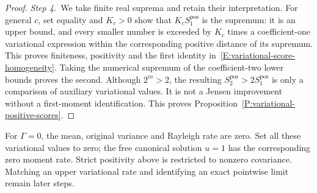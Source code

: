\begin{proof}
  \medskip
  \noindent\textit{Step 4.~}We take finite real suprema and retain their
  interpretation.
  For general $c$, set equality and $K_c > 0$ show that $K_cS_1^{\mathrm{pos}}$
  is the supremum: it is an upper bound, and every smaller number is exceeded by
  $K_c$ times a coefficient-one variational expression within the corresponding
  positive distance of its supremum. This proves finiteness, positivity and the
  first identity in~\eqref{E:variational-score-homogeneity}. Taking the
  numerical supremum of the coefficient-two lower bounds proves the second.
  Although $2^m > 2$, the resulting $S_2^{\mathrm{pos}} > 2S_1^{\mathrm{pos}}$
  is only a comparison of auxiliary variational values. It is not a Jensen
  improvement without a first-moment identification. This proves
  Proposition~\ref{P:variational-positive-scores}.
\end{proof}

For $\Gamma = 0$, the mean, original variance and Rayleigh rate are zero. Set
all these variational values to zero; the free canonical solution $u = 1$ has
the corresponding zero moment rate. Strict positivity above is restricted to
nonzero covariance. Matching an upper variational rate and identifying an exact
pointwise limit remain later steps.
